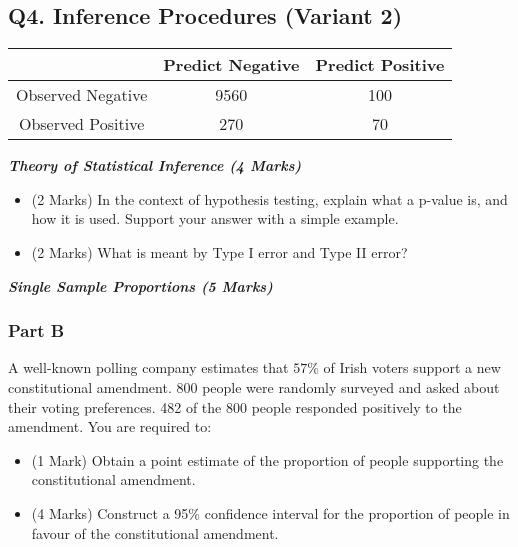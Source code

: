 \documentclass[]{article}
\begin{document}
\subsection*{Q4. Inference Procedures (Variant 2)}


\begin{center}
\begin{tabular}{|c|c|c|}
\hline  & \phantom{spa}Predict Negative\phantom{spa} & \phantom{spa}Predict Positive\phantom{spa} \\ 
\hline\phantom{spa} Observed Negative \phantom{spa}&	9560	&	100	\\ 
\hline \phantom{spa}Observed Positive\phantom{spa} & 	270	&	70	\\ 
\hline 
\end{tabular} 
\end{center}

\item[(b)] \textbf{\textit{Theory of Statistical Inference (4 Marks)}}\\
\begin{itemize}
\item[i.](2 Marks) In the context of hypothesis testing, explain what a p-value is, and how it is used. Support your answer with a simple example.
\item[ii.](2 Marks) What is meant by Type I error and Type II error?
\end{itemize}

\item[(c)] \textbf{\textit{Single Sample Proportions (5 Marks)}}\\
\subsubsection*{Part B} %
A well-known polling company estimates that $57\%$ of Irish voters support a new constitutional amendment. 800 people were randomly surveyed and asked about their voting preferences. 482 of the 800 people responded positively to the amendment. You are required to:

\begin{itemize}
\item [i.](1 Mark) Obtain a point estimate of the proportion of people supporting the constitutional amendment.
\item [ii.](4 Marks) Construct a 95\% confidence interval for the proportion of people in favour of the constitutional amendment.
\end{itemize}
\end{document}
